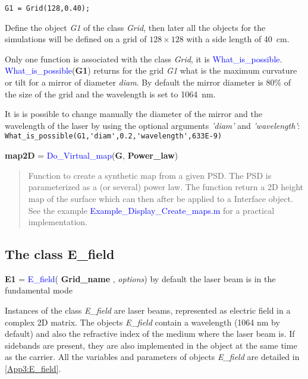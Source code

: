 \begin{verbatim}
G1 = Grid(128,0.40);
\end{verbatim}

Define the object \textsl{G1} of the class \textsl{Grid}, then later all the objects for the simulations will be defined on a grid of $128 \times 128$ with a side length of 40~cm.

Only one function is associated with the class \textsl{Grid}, it is \textcolor{blue}{What\_is\_possible}. \textcolor{blue}{What\_is\_possible}(\textbf{G1}) returns for the grid \textsl{G1} what is the maximum curvature or tilt for a mirror of diameter \textsl{diam}. By default the mirror diameter is 80\% of the size of the grid and the wavelength is set to 1064~nm.

It is is possible to change manually the diameter of the mirror and the wavelength of the laser by using the optional arguments \emph{'diam'} and \emph{'wavelength'}: \verb? What_is_possible(G1,'diam',0.2,'wavelength',633E-9) ?

\noindent \textbf{map2D} = \textcolor{blue}{Do\_Virtual\_map}(\textbf{G}, \textbf{Power\_law})
\vspace*{-0.2cm}
\begin{quote}
Function to create a synthetic map from a given PSD. The PSD is parameterized as a (or several) power law. The function return a 2D height map of the surface which can then after be applied to a Interface object. See the example \textcolor{blue}{Example\_Display\_Create\_maps.m} for a practical implementation.
\end{quote}


\subsection{The class E\_field}
\textbf{E1} = \textcolor{blue}{E\_field}( \textbf{Grid\_name} , \emph{options}) by default the laser beam is in the fundamental mode

Instances of the class \textsl{E\_field} are laser beams, represented as electric field in a complex 2D matrix. The objects \textsl{E\_field} contain a wavelength (1064 nm by default) and also the refractive index of the medium where the laser beam is. If sidebands are present, they are also implemented in the object at the same time as the carrier. All the variables and parameters of objects \textsl{E\_field} are detailed in \ref{App3:E_field}.


